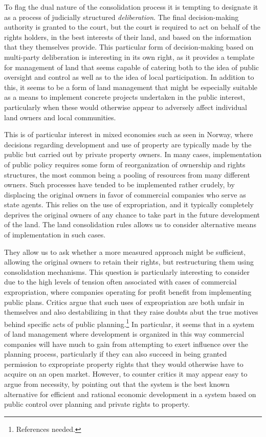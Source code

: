 To flag the dual nature of the consolidation process it is tempting to designate it as a process of judicially structured \emph{deliberation}. The final decision-making authority is granted to the court, but the court is required to act on behalf of the rights holders, in the best interests of their land, and based on the information that they themselves provide. This particular form of decision-making based on multi-party deliberation is interesting in its own right, as it provides a template for management of land that seems capable of catering both to the idea of public oversight and control as well as to the idea of local participation. In addition to this, it seems to be a form of land management that might be especially suitable as a means to implement concrete projects undertaken in the public interest, particularly when these would otherwise appear to adversely affect individual land owners and local communities.

This is of particular interest in mixed economies such as seen in Norway, where decisions regarding development and use of property are typically made by the public but carried out by private property owners. In many cases, implementation of public policy requires some form of reorganization of ownership and rights structures, the most common being a pooling of resources from many different owners. Such processes have tended to be implemented rather crudely, by displacing the original owners in favor of commercial companies who serve as state agents. This relies on the use of expropriation, and it typically completely deprives the original owners of any chance to take part in the future development of the land. The land consolidation rules allows us to consider alternative means of implementation in such cases. 

They allow us to ask whether a more measured approach might be sufficient, allowing the original owners to retain their rights, but restructuring them using consolidation mechanisms. This question is particularly interesting to consider due to the high levels of tension often associated with cases of commercial expropriation, where companies operating for profit benefit from implementing public plans. Critics argue that such uses of expropriation are both unfair in themselves and also destabilizing in that they raise doubts abut the true motives behind specific acts of public planning.\footnote{References needed.} In particular, it seems that in a system of land management where development is organized in this way commercial companies will have much to gain from attempting to exert influence over the planning process, particularly if they can also succeed in being granted permission to expropriate property rights that they would otherwise have to acquire on an open market. However, to counter critics it may appear easy to argue from necessity, by pointing out that the system is the best known alternative for efficient and rational economic development in a system based on public control over planning and private rights to property.

